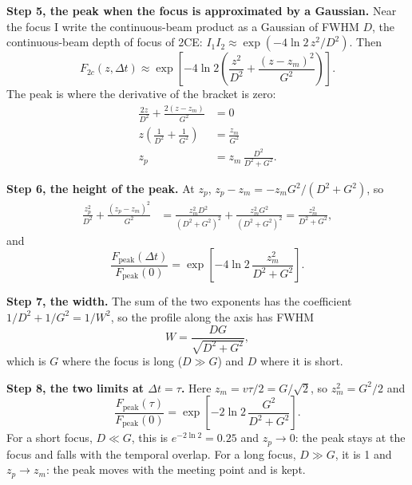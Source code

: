 \documentclass[11pt]{article}
\begin{document}
\textbf{Step 5, the peak when the focus is approximated by a Gaussian.} Near the focus I write the
continuous-beam product as a Gaussian of FWHM $D$, the continuous-beam depth of focus of 2CE:
$I_1I_2 \approx \exp(-4\ln 2\,z^2/D^2)$. Then
\begin{equation}F_{2c}(z,\Delta t) \approx \exp\!\left[-4\ln 2\left(\frac{z^2}{D^2} + \frac{(z-z_m)^2}{G^2}\right)\right] .\end{equation}
The peak is where the derivative of the bracket is zero:
\begin{align}\frac{2z}{D^2} + \frac{2(z - z_m)}{G^2} &= 0\\
z\left(\frac{1}{D^2} + \frac{1}{G^2}\right) &= \frac{z_m}{G^2}\\
z_p &= z_m\,\frac{D^2}{D^2 + G^2} .\label{eq:zp}\end{align}

\textbf{Step 6, the height of the peak.} At $z_p$, $z_p - z_m = -z_mG^2/(D^2+G^2)$, so
\begin{align}\frac{z_p^2}{D^2} + \frac{(z_p - z_m)^2}{G^2}
&= \frac{z_m^2D^2}{(D^2+G^2)^2} + \frac{z_m^2G^2}{(D^2+G^2)^2}
= \frac{z_m^2}{D^2+G^2} ,\end{align}
and
\begin{equation}\frac{F_{\text{peak}}(\Delta t)}{F_{\text{peak}}(0)}
= \exp\!\left[-4\ln 2\,\frac{z_m^2}{D^2 + G^2}\right] .\end{equation}

\textbf{Step 7, the width.} The sum of the two exponents has the coefficient $1/D^2 + 1/G^2 = 1/W^2$, so the
profile along the axis has FWHM
\begin{equation}W = \frac{DG}{\sqrt{D^2 + G^2}} ,\label{eq:W}\end{equation}
which is $G$ where the focus is long ($D \gg G$) and $D$ where it is short.

\textbf{Step 8, the two limits at $\Delta t = \tau$.} Here $z_m = v\tau/2 = G/\sqrt2$, so $z_m^2 = G^2/2$ and
\begin{equation}\frac{F_{\text{peak}}(\tau)}{F_{\text{peak}}(0)} = \exp\!\left[-2\ln 2\,\frac{G^2}{D^2 + G^2}\right] .\label{eq:peaktau}\end{equation}
For a short focus, $D \ll G$, this is $e^{-2\ln 2} = 0.25$ and $z_p \to 0$: the peak stays at the focus and falls
with the temporal overlap. For a long focus, $D \gg G$, it is 1 and $z_p \to z_m$: the peak moves with the
meeting point and is kept.
\end{document}
